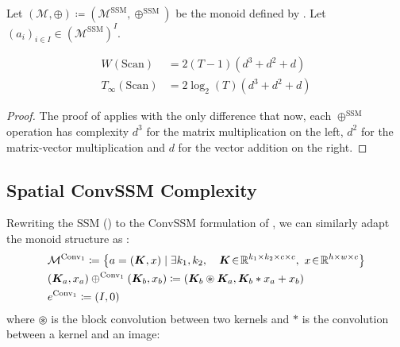 \documentclass{article}
\begin{document}
\begin{proposition}
    Let $(\mathcal{M}, \oplus) \coloneqq (\mathcal{M}^{\mathrm{SSM}}, \oplus^{\mathrm{SSM}})$ be the monoid defined by . Let $(a_i)_{i\in I}\in (\mathcal{M}^{\mathrm{SSM}})^I$.

\begin{align}
    W(\mathrm{Scan})&= 2(T-1)(d^3+d^2+d)\\
    T_\infty(\mathrm{Scan})&= 2\log_2 (T) (d^3+d^2+d)
\end{align}
\end{proposition}

\begin{proof}
The proof of  applies with the only difference that now, each $\oplus^{\mathrm{SSM}}$ operation has complexity $d^3$ for the matrix multiplication on the left, $d^2$ for the matrix-vector multiplication and $d$ for the vector addition on the right.
\end{proof}

\subsection{Spatial ConvSSM Complexity}
\label{app:Spatial_ConvSSM_complexity}

Rewriting the SSM () to the ConvSSM formulation of , we can similarly adapt the monoid structure as :
\begin{align}
    &\mathcal{M}^{\mathrm{Conv}_1}\coloneqq \left\{a = (\bm{K}, x)\mid \exists k_1, k_2,\quad \bm{K}\!\in\!\mathbb{R}^{k_1\times k_2\times c\times c},~x\!\in\!\mathbb{R}^{h \times w \times c}\right\}\\
    &(\bm{K}_a, x_a) \oplus^{\mathrm{Conv}_1} (\bm{K}_b,x_b)\coloneqq (\bm{K}_b \circledast \bm{K}_a, \bm{K}_b \ast x_a + x_b)\\
    &e^{\mathrm{Conv}_1}\coloneqq(I, 0)
\end{align}
\noindent where $\circledast$ is the block convolution between two kernels and $\ast$ is the convolution between a kernel and an image:
\end{document}
